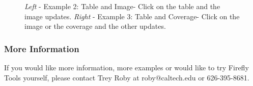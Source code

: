 \begin{figure}[!ht]
\caption{\small \newline \textit{Left} - Example 2: Table and Image- Click on the table and the image updates. 
\newline \textit{Right} - Example 3: Table and Coverage- Click on the image or the coverage and the other updates.}
\label{table-and-preview}
\end{figure}
\normalsize

\subsubsection{More Information}
If you would like more information, more examples or would like to try Firefly Tools yourself, please contact Trey Roby at roby@caltech.edu or 626-395-8681.
